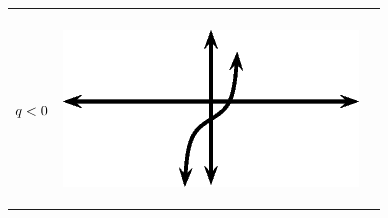 \begin{center}
\begin{xtabular*}{\mytablewidth}[t]{|p{10\mystarwidth}|p{10\mystarwidth}|p{10\mystarwidth}|}
    \addtocounter{footnote}{-0}
    
     \tabularnewline{}
    
    
        
                  \begin{math}q<{}0\end{math}
                 &
    
    
        
                  
    \setcounter{subfigure}{0}

\label{m39414*id91030}
    \begin{center}
    \label{m39414*id91030!!!underscore!!!media}\label{m39414*id91030!!!underscore!!!printimage}\includegraphics{col11306.imgs/m39414_MG10C15_036.png} %
        
      \vspace{2pt}
    \vspace{.1in}
    
    \end{center}



    \addtocounter{footnote}{-0}
    
                 &
    
    
        

\end{xtabular*}
\end{center}
